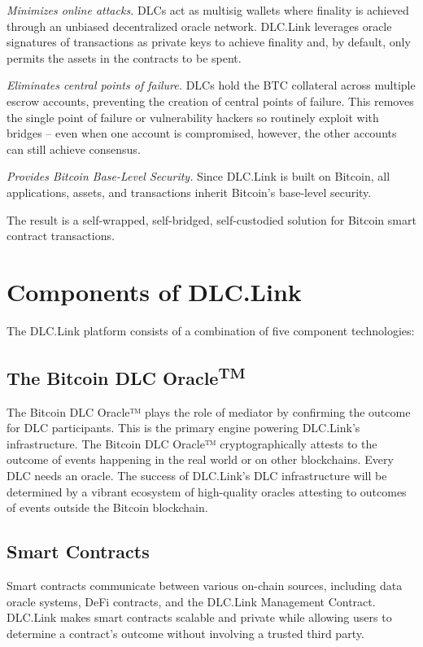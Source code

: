 \documentclass[twoside, a4paper, 11pt]{article}
\begin{document}
  \emph{Minimizes online attacks.} DLCs act as multisig wallets where finality is achieved through an unbiased decentralized oracle network. DLC.Link leverages oracle signatures of transactions as private keys to achieve finality and, by default, only permits the assets in the contracts to be spent.

  \emph{Eliminates central points of failure.} DLCs hold the BTC collateral across multiple escrow accounts, preventing the creation of central points of failure. This removes the single point of failure or vulnerability hackers so routinely exploit with bridges – even when one account is compromised, however, the other accounts can still achieve consensus.

  \emph{Provides Bitcoin Base-Level Security.} Since DLC.Link is built on Bitcoin, all applications, assets, and transactions inherit Bitcoin’s base-level security.

  The result is a self-wrapped, self-bridged, self-custodied solution for Bitcoin smart contract transactions.


  \section{Components of DLC.Link}

  The DLC.Link platform consists of a combination of five component technologies:

  \subsection{The Bitcoin DLC Oracle\textsuperscript{TM}}

  The Bitcoin DLC Oracle™ plays the role of mediator by confirming the outcome for DLC participants. This is the primary engine powering DLC.Link’s infrastructure. The Bitcoin DLC Oracle™ cryptographically attests to the outcome of events happening in the real world or on other blockchains. Every DLC needs an oracle. The success of DLC.Link’s DLC infrastructure will be determined by a vibrant ecosystem of high-quality oracles attesting to outcomes of events outside the Bitcoin blockchain.

  \subsection{Smart Contracts}

  Smart contracts communicate between various on-chain sources, including data oracle systems, DeFi contracts, and the DLC.Link Management Contract. DLC.Link makes smart contracts scalable and private while allowing users to determine a contract’s outcome without involving a trusted third party.
\end{document}
